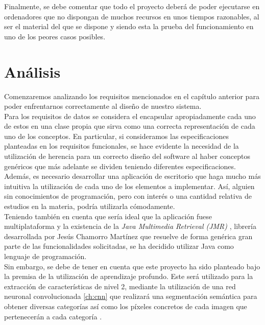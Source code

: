 Finalmente, se debe comentar que todo el proyecto deberá de poder ejecutarse en ordenadores que no dispongan de muchos recursos en unos tiempos razonables, al ser el material del que se dispone y siendo esta la prueba del funcionamiento en uno de los peores casos posibles.

\chapter{Análisis}
Comenzaremos analizando los requisitos mencionados en el capítulo anterior para poder enfrentarnos correctamente al diseño de nuestro sistema.\\

Para los requisitos de datos se considera el encapsular apropiadamente cada uno de estos en una clase propia que sirva como una correcta representación de cada uno de los conceptos. En particular, si consideramos las especificaciones planteadas en los requisitos funcionales, se hace evidente la necesidad de la utilización de herencia para un correcto diseño del software al haber conceptos genéricos que más adelante se dividen teniendo diferentes especificaciones.\\

Además, es necesario desarrollar una aplicación de escritorio que haga mucho más intuitiva la utilización de cada uno de los elementos a implementar. Así, alguien sin conocimientos de programación, pero con interés o una cantidad relativa de estudios en la materia, podría utilizarla cómodamente.\\

Teniendo también en cuenta que sería ideal que la aplicación fuese multiplataforma y la existencia de la \emph{Java Multimedia Retrieval (JMR)} \cite{JMR}, librería desarrollada por Jesús Chamorro Martínez que resuelve de forma genérica gran parte de las funcionalidades solicitadas, se ha decidido utilizar Java como lenguaje de programación.\\

Sin embargo, se debe de tener en cuenta que este proyecto ha sido planteado bajo la premisa de la utilización de aprendizaje profundo. Este será utilizado para la extracción de características de nivel 2, mediante la utilización de una red neuronal convolucionada \autoref{ch:cnn} que realizará una segmentación semántica para obtener diversas categorías así como los píxeles concretos de cada imagen que pertenecerán a cada categoría \cite{ch:fast-attention}.\\

